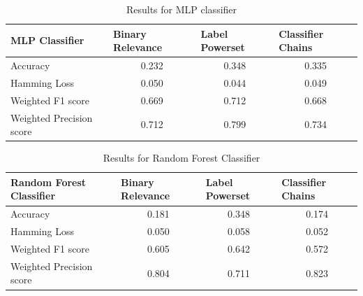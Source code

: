 \iffalse
\begin{table}[!htb]
\begin{tabular}{|l|c|c|c|}
\hline
MLP Classifier           & \multicolumn{1}{l|}{Binary Relevance} & \multicolumn{1}{l|}{Label Powerset} & \multicolumn{1}{l|}{Classifier Chains} \\ \hline
Accuracy                 & 0.232                                 & 0.348                               & 0.335                                  \\ \hline
Hamming Loss             & 0.050                                 & 0.044                               & 0.049                                  \\ \hline
Weighted F1 score        & 0.669                                 & 0.712                               & 0.668                                  \\ \hline
Weighted Precision score & 0.712                                 & 0.799                               & 0.734                                  \\ \hline
\end{tabular}
\caption{Results for MLP classifier}
\label{table:MLP}
\end{table}




\begin{table}[!htb]
    \centering
    \begin{tabular}{|l|c|c|c|}
\hline
Random Forest Classifier & \multicolumn{1}{l|}{Binary Relevance} & \multicolumn{1}{l|}{Label Powerset} & \multicolumn{1}{l|}{Classifier Chains} \\ \hline
Accuracy                 & 0.181                                 & 0.348                               & 0.174                                  \\ \hline
Hamming Loss             & 0.050                                 & 0.058                               & 0.052                                  \\ \hline
Weighted F1 score        & 0.605                                 & 0.642                               & 0.572                                  \\ \hline
Weighted Precision score & 0.804                                 & 0.711                               & 0.823                                  \\ \hline
\end{tabular}
    \caption{Results for Random Forest Classifier}
    \label{tab:randomforest}
\end{table}

